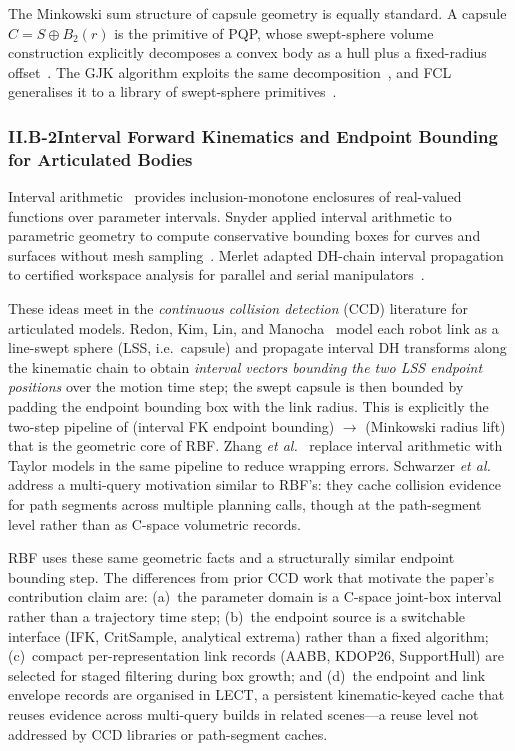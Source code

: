 \documentclass[11pt,a4paper]{article}
\newcommand{\rbf}{\textsc{RBF}}
\newcommand{\etal}{\textit{et al.}}
\begin{document}
The Minkowski sum structure of capsule geometry is equally standard.  A capsule
$C = S \oplus B_2(r)$ is the primitive of PQP, whose swept-sphere volume
construction explicitly decomposes a convex body as a hull plus a fixed-radius
offset~\cite{larsen1999fast}.  The GJK algorithm exploits the same
decomposition~\cite{gilbert1988fast,bergen1999gjk}, and FCL generalises it to
a library of swept-sphere primitives~\cite{pan2012fcl}.

\subsubsection*{II.B-2\quad Interval Forward Kinematics and Endpoint Bounding
  for Articulated Bodies}

Interval arithmetic~\cite{moore1966interval,moore2009introduction,jaulin2001applied}
provides inclusion-monotone enclosures of real-valued functions over parameter
intervals.  Snyder applied interval arithmetic to parametric geometry to compute
conservative bounding boxes for curves and surfaces without mesh
sampling~\cite{snyder1992interval}.  Merlet adapted DH-chain interval
propagation to certified workspace analysis for parallel and serial
manipulators~\cite{merlet2004solving,merlet2009interval}.

These ideas meet in the \emph{continuous collision detection} (CCD) literature for
articulated models.  Redon, Kim, Lin, and Manocha~\cite{redon2004continuous_avatar,
redon2005fast} model each robot link as a line-swept sphere (LSS, i.e.~capsule)
and propagate interval DH transforms along the kinematic chain to obtain
\emph{interval vectors bounding the two LSS endpoint positions} over the motion
time step; the swept capsule is then bounded by padding the endpoint bounding
box with the link radius.  This is explicitly the two-step pipeline of
(interval FK endpoint bounding) $\to$ (Minkowski radius lift) that is the geometric
core of \rbf{}.  Zhang \etal{}~\cite{zhang2007taylor} replace interval arithmetic
with Taylor models in the same pipeline to reduce wrapping errors.  Schwarzer
\etal{}~\cite{schwarzer2005adaptive} address a multi-query motivation similar to
\rbf{}'s: they cache collision evidence for path segments across multiple planning
calls, though at the path-segment level rather than as C-space volumetric records.

\rbf{} uses these same geometric facts and a structurally similar endpoint
bounding step.  The differences from prior CCD work that motivate the paper's
contribution claim are: (a)~the parameter domain is a C-space joint-box interval
rather than a trajectory time step; (b)~the endpoint source is a switchable
interface (IFK, CritSample, analytical extrema) rather than a fixed algorithm;
(c)~compact per-representation link records (AABB, KDOP26, SupportHull) are
selected for staged filtering during box growth; and (d)~the endpoint and link
envelope records are organised in LECT, a persistent kinematic-keyed cache that
reuses evidence across multi-query builds in related scenes---a reuse level not
addressed by CCD libraries or path-segment caches.
\end{document}
